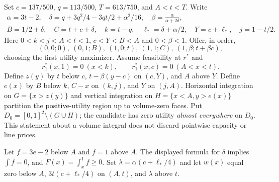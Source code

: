 Set $c=137/500$, $q=113/500$, $T=613/750$, and $A<t<T$. Write
\[
\begin{gathered}
\alpha=3t-2,\quad
\delta=q+3q^2/4-3qt/2+\alpha^2/16,\quad
\beta=\frac{\alpha}{\alpha+2\delta},\\
B=1/2+\delta,\quad C=t+c+\delta,\quad k=t-q,\quad
\ell_*=\delta+\alpha/2,\quad Y=c+\ell_*,\quad j=1-t/2.
\end{gathered}
\]
Here $0<k<j<A<t<1$, $c<Y<B<A$ and $0<\beta<1$. Offer, in order,
\[
(0,0;0),\ (0,1;B),\ (1,0;t),\ (1,1;C),\
(1,\beta;t+\beta c),
\]
choosing the first utility maximizer. Assume feasibility at $r^*$ and
\begin{equation}\label{eq:lottery-traces}
r^*_1(x,1)=0\ (x<k),\qquad
r^*_1(x,c)=0\ (A<x<t).
\end{equation}
Define $z(y)$ by $t$ below $c$, $t-\beta(y-c)$ on $(c,Y)$, and $A$
above $Y$. Define $e(x)$ by $B$ below $k$, $C-x$ on $(k,j)$, and $Y$
on $(j,A)$. Horizontal integration on $G=\{x>z(y)\}$ and vertical
integration on $H=\{x<A,y>e(x)\}$ partition the positive-utility region
up to volume-zero faces. Put $D_0=[0,1]^2\setminus(G\cup H)$; the
candidate has zero utility \emph{almost everywhere} on $D_0$. This statement
about a volume integral does not discard pointwise capacity or line prices.

Let $f=3e-2$ below $A$ and $f=1$ above $A$. The displayed formula for
$\delta$ implies $\int f=0$, and $F(x)=\int_x^1 f\ge0$. Set
$\lambda=\alpha(c+\ell_*/4)$ and let $w(x)$ equal zero below $A$,
$3t(c+\ell_*/4)$ on $(A,t)$, and $\lambda$ above $t$.

